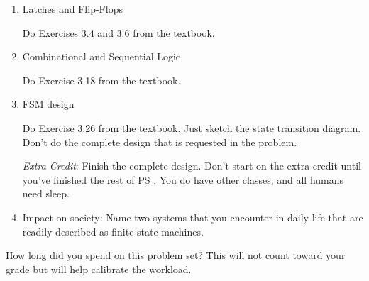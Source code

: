 \documentclass{ps}
\begin{document}
\begin{enumerate}
\item Latches and Flip-Flops

  Do Exercises 3.4 and 3.6 from the textbook.
  \begin{solution}
  \end{solution}

\item Combinational and Sequential Logic

  Do Exercise 3.18 from the textbook.
  \begin{solution}
  \end{solution}

\item FSM design

  Do Exercise 3.26 from the textbook.  Just sketch the state
  transition diagram.  Don't do the complete design that is requested
  in the problem.

  \textit{Extra Credit}: Finish the complete design.  Don't start on
  the extra credit until you've finished the rest of PS \theps.  You
  do have other classes, and all humans need sleep.
  \begin{solution}
  \end{solution}

\item Impact on society: Name two systems that you encounter in daily
  life that are readily described as finite state machines.
  \begin{solution}
  \end{solution}
\end{enumerate}

How long did you spend on this problem set?  This will not count
toward your grade but will help calibrate the workload.
\begin{solution}
\end{solution}
\end{document}
